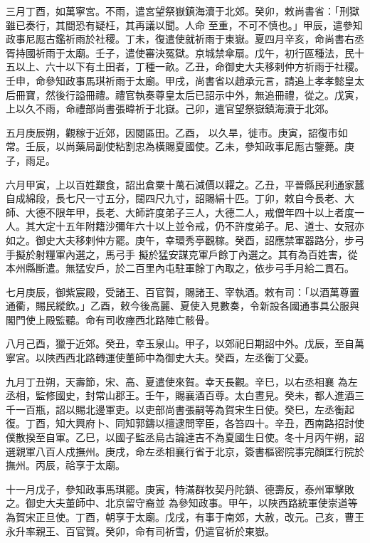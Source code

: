 \begin{pinyinscope}
 三月丁酉，如萬寧宮。不雨，遣宮望祭嶽鎮海瀆于北郊。癸卯，敕尚書省：「刑獄雖已奏行，其間恐有疑枉，其再議以聞。人命
 至重，不可不慎也。」甲辰，遣參知政事尼厖古鑑祈雨於社稷。丁未，復遣使就祈雨于東嶽。夏四月辛亥，命尚書右丞胥持國祈雨于太廟。壬子，遣使審決冤獄。京城禁傘扇。戊午，初行區種法，民十五以上、六十以下有土田者，丁種一畝。乙丑，命御史大夫移剌仲方祈雨于社稷。壬申，命參知政事馬琪祈雨于太廟。甲戌，尚書省以趙承元言，請追上孝孝懿皇太后冊寶，然後行謚冊禮。禮官執奏尊皇太后已詔示中外，無追冊禮，從之。戊寅，上以久不雨，命禮部尚書張暐祈于北嶽。己卯，遣官望祭嶽鎮海瀆于北郊。



 五月庚辰朔，觀稼于近郊，因閱區田。乙酉，
 以久旱，徙市。庚寅，詔復市如常。壬辰，以尚藥局副使粘割忠為橫賜夏國使。乙未，參知政事尼厖古鑒薨。庚子，雨足。



 六月甲寅，上以百姓艱食，詔出倉粟十萬石減價以糶之。乙丑，平晉縣民利通家蠶自成綿段，長七尺一寸五分，闊四尺九寸，詔賜絹十匹。丁卯，敕自今長老、大師、大德不限年甲，長老、大師許度弟子三人，大德二人，戒僧年四十以上者度一人。其大定十五年附籍沙彌年六十以上並令戒，仍不許度弟子。尼、道士、女冠亦如之。御史大夫移剌仲方罷。庚午，幸環秀亭觀稼。癸酉，詔應禁軍器路分，步弓手擬於射糧軍內選之，馬弓手
 擬於猛安謀克軍戶餘丁內選之。其有為百姓害，從本州縣斷遣。無猛安戶，於二百里內屯駐軍餘丁內取之，依步弓手月給二貫石。



 七月庚辰，御紫宸殿，受諸王、百官賀，賜諸王、宰執酒。敕有司：「以酒萬尊置通衢，賜民縱飲。」乙酉，敕今後高麗、夏使入見數奏，令新設各國通事具公服與閣門使上殿監聽。命有司收瘞西北路陣亡骸骨。



 八月己酉，獵于近郊。癸丑，幸玉泉山。甲子，以郊祀日期詔中外。戊辰，至自萬寧宮。以陜西西北路轉運使董師中為御史大夫。癸酉，左丞衡丁父憂。



 九月丁丑朔，天壽節，宋、高、夏遣使來賀。幸天長觀。辛巳，以右丞相襄
 為左丞相，監修國史，封常山郡王。壬午，賜襄酒百尊。太白晝見。癸未，都人進酒三千一百瓶，詔以賜北邊軍吏。以吏部尚書張嗣等為賀宋生日使。癸巳，左丞衡起復。丁酉，知大興府卜、同知郭鑄以擅逮問宰臣，各笞四十。辛丑，西南路招討使僕散揆至自軍。乙巳，以國子監丞烏古論達吉不為夏國生日使。冬十月丙午朔，詔選親軍八百人戍撫州。庚戌，命左丞相襄行省于北京，簽書樞密院事完顏匡行院於撫州。丙辰，祫享于太廟。



 十一月戊子，參知政事馬琪罷。庚寅，特滿群牧契丹陀鎖、德壽反，泰州軍擊敗之。御史大夫董師中、北京留守裔並
 為參知政事。甲午，以陜西路統軍使崇道等為賀宋正旦使。丁酉，朝享于太廟。戊戌，有事于南郊，大赦，改元。己亥，曹王永升率親王、百官賀。癸卯，命有司祈雪，仍遣官祈於東嶽。




\end{pinyinscope}
